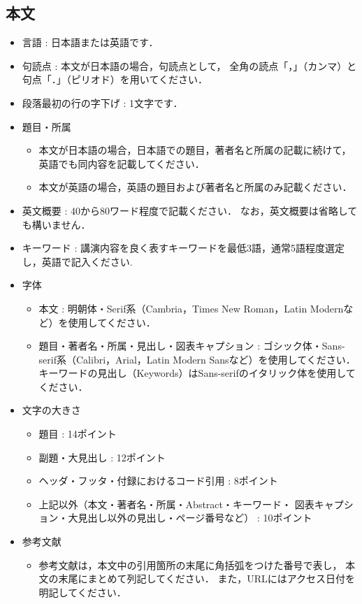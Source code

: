 \documentclass{ltjoc}
\begin{document}
\subsection{本文}
\begin{itemize}
\item 言語 : 日本語または英語です．
\item 句読点 : 本文が日本語の場合，句読点として，
  全角の読点「，」（カンマ）と句点「．」（ピリオド）を用いてください． 
\item 段落最初の行の字下げ : 1文字です．
\item 題目・所属
  \begin{itemize}
  \item 
    本文が日本語の場合，日本語での題目，著者名と所属の記載に続けて，
    英語でも同内容を記載してください．
  \item 
    本文が英語の場合，英語の題目および著者名と所属のみ記載ください．
  \end{itemize}
\item 英文概要 : 40から80ワード程度で記載ください．
  なお，英文概要は省略しても構いません．
\item キーワード : 講演内容を良く表すキーワードを最低3語，通常5語程度選定し，英語で記入ください.
\item 字体
  \begin{itemize}
  \item 本文 :
    明朝体・Serif系（Cambria，Times New Roman，Latin Modernなど）を使用してください．
  \item 題目・著者名・所属・見出し・図表キャプション : 
    ゴシック体・Sans-serif系（Calibri，Arial，Latin Modern Sansなど）を使用してください．
    キーワードの見出し（Keywords）はSans-serifのイタリック体を使用してください．
  \end{itemize}
\item 文字の大きさ
  \begin{itemize}
  \item 題目 : 14ポイント
  \item 副題・大見出し : 12ポイント
  \item ヘッダ・フッタ・付録におけるコード引用 : 8ポイント
  \item 上記以外（本文・著者名・所属・Abstract・キーワード・
      図表キャプション・大見出し以外の見出し・ページ番号など） : 10ポイント
  \end{itemize}
\item 参考文献
  \begin{itemize}
  \item 
  参考文献は，本文中の引用箇所の末尾に角括弧をつけた番号で表し，
  本文の末尾にまとめて列記してください\cite{Nishi:OpenCAE2018-001,BB21459576}．
  また，URLにはアクセス日付を明記してください\cite{SIST02-200}．
  \end{itemize}
\end{itemize}
\end{document}
